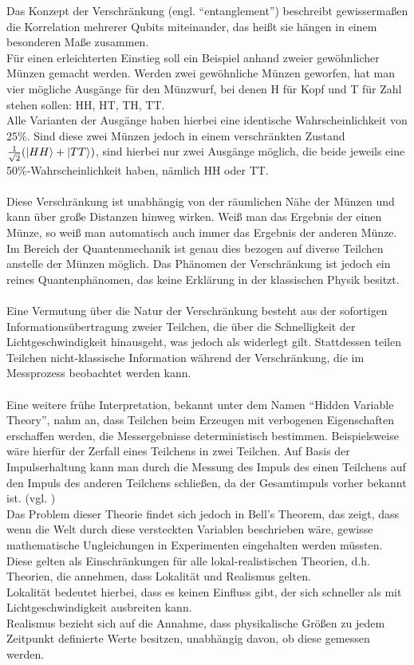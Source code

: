 Das Konzept der Verschränkung (engl. ``entanglement'') beschreibt gewissermaßen die Korrelation mehrerer Qubits miteinander, das heißt sie hängen in einem besonderen Maße zusammen. \\
Für einen erleichterten Einstieg soll ein Beispiel anhand zweier gewöhnlicher Münzen gemacht werden. Werden zwei gewöhnliche Münzen geworfen, hat man vier mögliche Ausgänge für den Münzwurf, bei denen H für Kopf und T für Zahl stehen sollen: HH, HT, TH, TT. \\
Alle Varianten der Ausgänge haben hierbei eine identische Wahrscheinlichkeit von 25\%. Sind diese zwei Münzen jedoch in einem verschränkten Zustand  $\frac{1}{\sqrt{2}} (\ket{HH} + \ket{TT})$, sind hierbei nur zwei Ausgänge möglich, die beide jeweils eine 50\%-Wahrscheinlichkeit haben, nämlich HH oder TT. \\ \\
Diese Verschränkung ist unabhängig von der räumlichen Nähe der Münzen und kann über große Distanzen hinweg wirken. Weiß man das Ergebnis der einen Münze, so weiß man automatisch auch immer das Ergebnis der anderen Münze. Im Bereich der Quantenmechanik ist genau dies bezogen auf diverse Teilchen anstelle der Münzen möglich. 
Das Phänomen der Verschränkung ist jedoch ein reines Quantenphänomen, das keine Erklärung in der klassischen Physik besitzt. \\ \\
Eine Vermutung über die Natur der Verschränkung besteht aus der sofortigen Informationsübertragung zweier Teilchen, die über die Schnelligkeit der Lichtgeschwindigkeit hinausgeht, was jedoch als widerlegt gilt. Stattdessen teilen Teilchen nicht-klassische Information während der Verschränkung, die im Messprozess beobachtet werden kann. \\ \\
Eine weitere frühe Interpretation, bekannt unter dem Namen ``Hidden Variable Theory'', nahm an, dass Teilchen beim Erzeugen mit verbogenen Eigenschaften erschaffen werden, die Messergebnisse deterministisch bestimmen. Beispielsweise wäre hierfür der Zerfall eines Teilchens in zwei Teilchen. Auf Basis der Impulserhaltung kann man durch die Messung des Impuls des einen Teilchens auf den Impuls des anderen Teilchens schließen, da der Gesamtimpuls vorher bekannt ist. 
(vgl. \cite[Ch. 7]{hughes_quantum_2021})
\\ 

Das Problem dieser Theorie findet sich jedoch in Bell's Theorem, das zeigt, dass wenn die Welt durch diese versteckten Variablen beschrieben wäre, gewisse mathematische Ungleichungen in Experimenten eingehalten werden müssten. 
Diese gelten als Einschränkungen für alle lokal-realistischen Theorien, d.h. Theorien, die annehmen, dass Lokalität und Realismus gelten. \\ 
Lokalität bedeutet hierbei, dass es keinen Einfluss gibt, der sich schneller als mit Lichtgeschwindigkeit ausbreiten kann. \\
Realismus bezieht sich auf die Annahme, dass physikalische Größen zu jedem Zeitpunkt definierte Werte besitzen, unabhängig davon, ob diese gemessen werden. \\


